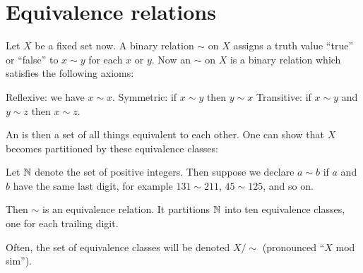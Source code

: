 \section{Equivalence relations}
Let $X$ be a fixed set now.
A binary relation $\sim$ on $X$ assigns a truth value ``true''
or ``false'' to $x \sim y$ for each $x$ or $y$.
Now an  $\sim$ on $X$ is a binary relation
which satisfies the following axioms:
\begin{itemize}
	\ii Reflexive: we have $x \sim x$.
	\ii Symmetric: if $x \sim y$ then $y \sim x$
	\ii Transitive: if $x \sim y$ and $y \sim z$ then $x \sim z$.
\end{itemize}
An  is then a
set of all things equivalent to each other.
One can show that $X$ becomes partitioned by these equivalence classes:

\begin{example}
	Let $\mathbb N$ denote the set of positive integers.
	Then suppose we declare $a \sim b$ if $a$ and $b$ have the same last digit,
	for example $131 \sim 211$, $45 \sim 125$, and so on.

	Then $\sim$ is an equivalence relation.
	It partitions $\mathbb N$ into ten equivalence classes,
	one for each trailing digit.
\end{example}

Often, the set of equivalence classes will be denoted $X/{\sim}$
(pronounced ``$X$ mod sim'').
